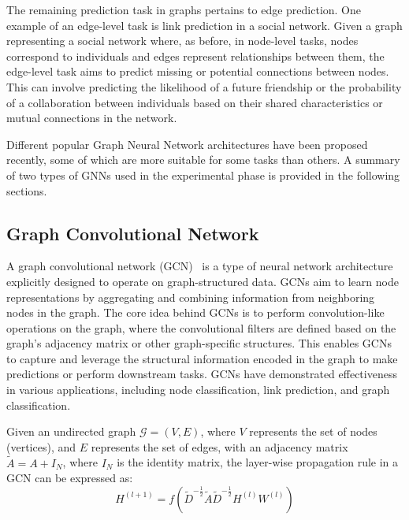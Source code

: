 \documentclass{Configuration_Files/PoliMi3i_thesis}
\begin{document}
    The remaining prediction task in graphs pertains to edge prediction.
    One example of an edge-level task is link prediction in a social network.
    Given a graph representing a social network where, as before, in node-level tasks, nodes correspond to individuals and edges represent relationships between them, the edge-level task aims to predict missing or potential connections between nodes.
    This can involve predicting the likelihood of a future friendship or the probability of a collaboration between individuals based on their shared characteristics or mutual connections in the network.

    Different popular Graph Neural Network architectures have been proposed recently, some of which are more suitable for some tasks than others.
    A summary of two types of GNNs used in the experimental phase is provided in the following sections.

    \subsection{Graph Convolutional Network}
    \label{subsec:graph_convolutional_network}%

    A graph convolutional network (GCN)~\cite{DBLP:journals/corr/KipfW16, daigavane2021understanding} is a type of neural network architecture explicitly designed to operate on graph-structured data.
    GCNs aim to learn node representations by aggregating and combining information from neighboring nodes in the graph.
    The core idea behind GCNs is to perform convolution-like operations on the graph, where the convolutional filters are defined based on the graph's adjacency matrix or other graph-specific structures.
    This enables GCNs to capture and leverage the structural information encoded in the graph to make predictions or perform downstream tasks.
    GCNs have demonstrated effectiveness in various applications, including node classification, link prediction, and graph classification.

    Given an undirected graph $\mathcal{G} = (V, E)$, where $V$ represents the set of nodes (vertices), and $E$ represents the set of edges, with an adjacency matrix $\tilde{A}=A+I_N$, where $I_N$ is the identity matrix, the layer-wise propagation rule in a GCN can be expressed as:
    \begin{equation}
        \label{eq:gcn_convolution}
            H^{(l+1)} = f(\tilde{D}^{-\tfrac{1}{2}}  \tilde{A}  \tilde{D}^{-\tfrac{1}{2}}  H^{(l)}  W^{(l)})
    \end{equation}
\end{document}
